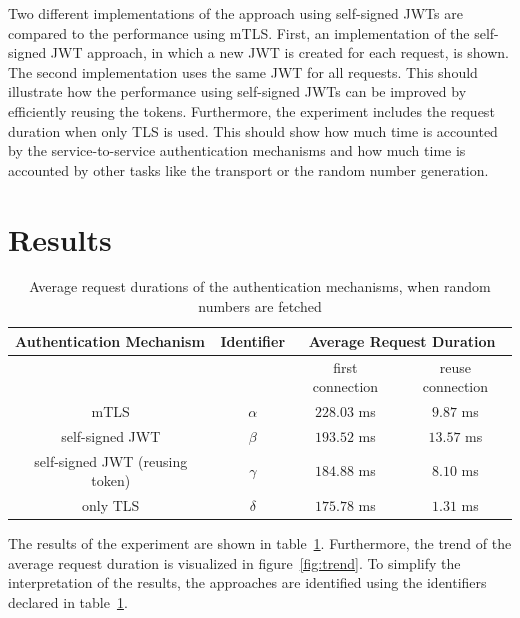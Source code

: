 Two different implementations of the approach using self-signed JWTs are compared to the performance using mTLS.
First, an implementation of the self-signed JWT approach, in which a new JWT is created for each request, is shown.
The second implementation uses the same JWT for all requests.
This should illustrate how the performance using self-signed JWTs can be improved by efficiently reusing the tokens.
Furthermore, the experiment includes the request duration when only TLS is used.
This should show how much time is accounted by the service-to-service authentication mechanisms and how much time is accounted by other tasks like the transport or the random number generation.

\section{Results}

\begin{table}[H]
	\centering
\begin{tabular}{c|c|cc}
	\multicolumn{1}{l|}{\textbf{Authentication Mechanism}} & \textbf{Identifier} & \multicolumn{2}{c}{\textbf{Average Request Duration}} \\ \hline
	\multicolumn{1}{c|}{} & & \multicolumn{1}{c|}{first connection} & reuse connection \\ \hline
	mTLS & $\alpha$ & \multicolumn{1}{c|}{$228.03$ ms} & $9.87$ ms \\ \hline
	self-signed JWT & $\beta$ & \multicolumn{1}{c|}{$193.52$ ms} & $13.57$ ms \\ \hline
	self-signed JWT (reusing token) & $\gamma$ & \multicolumn{1}{c|}{$184.88$ ms} & $8.10$ ms \\ \hline 
	only TLS & $\delta$ & \multicolumn{1}{c|}{$175.78$ ms} & $1.31$ ms
\end{tabular}
\caption{Average request durations of the authentication mechanisms, when random numbers are fetched}
\label{tab:experiment_case_1}
\end{table}

The results of the experiment are shown in table~\ref{tab:experiment_case_1}.
Furthermore, the trend of the average request duration is visualized in figure~\ref{fig:trend}.
To simplify the interpretation of the results, the approaches are identified using the identifiers declared in table~\ref{tab:experiment_case_1}.

